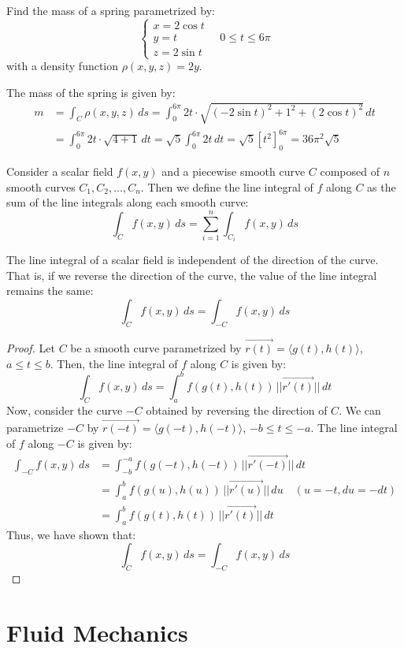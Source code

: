 \documentclass[11pt]{report}
\begin{document}
\begin{example}
    Find the mass of a spring parametrized by:
    $$
    \begin{cases}
        x = 2 \cos t \\
        y = t \\
        z = 2 \sin t
    \end{cases} \quad 0 \leq t \leq 6\pi
    $$
    with a density function $\rho(x,y,z) = 2y$.

    The mass of the spring is given by:
    \begin{align*}
        m &= \int_C \rho(x,y,z) \, ds = \int_0^{6\pi} 2t \cdot \sqrt{(-2\sin t)^2 + 1^2 + (2\cos t)^2} \, dt \\
        &= \int_0^{6\pi} 2t \cdot \sqrt{4 + 1} \, dt = \sqrt{5} \int_0^{6\pi} 2t \, dt = \sqrt{5} \left[ t^2 \right]_0^{6\pi} = 36\pi^2 \sqrt{5}
    \end{align*}    
\end{example}

\begin{definition}
    Consider a scalar field $f(x,y)$ and a piecewise smooth curve $C$ composed of $n$ smooth curves $C_1, C_2, \ldots, C_n$. Then we define the line integral of $f$ along $C$ as the sum of the line integrals along each smooth curve:
    \begin{equation}
        \int_C f(x,y) \, ds = \sum_{i=1}^n \int_{C_i} f(x,y) \, ds
    \end{equation}
\end{definition}

\begin{theorem} The line integral of a scalar field is independent of the direction of the curve. That is, if we reverse the direction of the curve, the value of the line integral remains the same:
\begin{equation}
    \int_C f(x,y) \, ds = \int_{-C} f(x,y) \, ds
\end{equation}
\end{theorem}
\begin{proof}
    Let $C$ be a smooth curve parametrized by $\vec{r(t)} = \langle g(t), h(t) \rangle$, $a \leq t \leq b$. Then, the line integral of $f$ along $C$ is given by:
    \begin{equation}
        \int_C f(x,y) \, ds = \int_a^b f(g(t), h(t)) \, ||\vec{r'(t)}|| \, dt
    \end{equation}
    Now, consider the curve $-C$ obtained by reversing the direction of $C$. We can parametrize $-C$ by $\vec{r(-t)} = \langle g(-t), h(-t) \rangle$, $-b \leq t \leq -a$. The line integral of $f$ along $-C$ is given by:
    \begin{align*}
        \int_{-C} f(x,y) \, ds &= \int_{-b}^{-a} f(g(-t), h(-t)) \, ||\vec{r'(-t)}|| \, dt \\
        &= \int_a^b f(g(u), h(u)) \, ||\vec{r'(u)}|| \, du \quad (u = -t, du = -dt) \\
        &= \int_a^b f(g(t), h(t)) \, ||\vec{r'(t)}|| \, dt
    \end{align*}
    Thus, we have shown that:
    $$
        \int_C f(x,y) \, ds = \int_{-C} f(x,y) \, ds
    $$
\end{proof}
\chapter{Fluid Mechanics}
\end{document}
